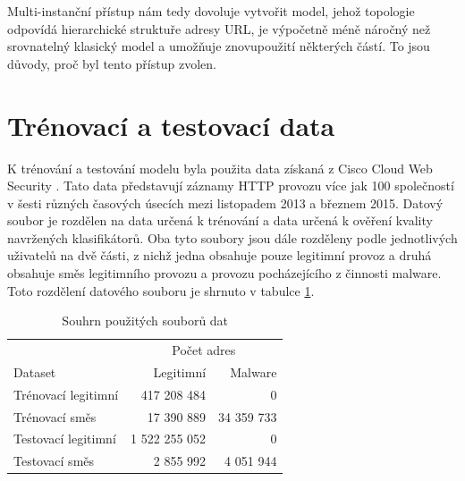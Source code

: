 Multi-instanční přístup nám tedy dovoluje vytvořit model, jehož topologie odpovídá hierarchické struktuře adresy URL, je výpočetně méně náročný než srovnatelný klasický model a umožňuje znovupoužití některých částí. To jsou důvody, proč byl tento přístup zvolen.

\section{Trénovací a testovací data}\label{dataset}

K trénování a testování modelu byla použita data získaná z Cisco Cloud Web Security . Tato data představují záznamy HTTP provozu více jak 100 společností v šesti různých časových úsecích mezi listopadem 2013 a březnem 2015. Datový soubor je rozdělen na data určená k trénování a data určená k ověření kvality navržených klasifikátorů. Oba tyto soubory jsou dále rozděleny podle jednotlivých uživatelů  na dvě části, z nichž jedna obsahuje pouze legitimní provoz a druhá obsahuje směs legitimního provozu a provozu pocházejícího z činnosti malware. Toto rozdělení datového souboru je shrnuto v tabulce \ref{dataset_table}.

\begin{table}[h]
	\caption{Souhrn použitých souborů dat}\label{dataset_table}
	\centering
	\begin{tabular}{lrr}
		\toprule
		\null & \multicolumn{2}{c}{Počet adres} \\
		\cmidrule(l){2-3}
		Dataset & Legitimní & Malware \\
		\midrule
		Trénovací legitimní & 417 208 484 & 0 \\
		Trénovací směs & 17 390 889 & 34 359 733 \\
		Testovací legitimní & 1 522 255 052 & 0 \\
		Testovací směs & 2 855 992 & 4 051 944 \\
		\bottomrule
	\end{tabular}
\end{table}
